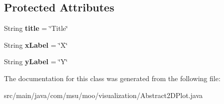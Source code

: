 \subsection*{Protected Attributes}
\begin{DoxyCompactItemize}
\item 
\hypertarget{classcom_1_1msu_1_1moo_1_1visualization_1_1Abstract2DPlot_ac147640f3cb063905aa1e197d3bef23a}{String {\bfseries title} = \char`\"{}Title\char`\"{}}\label{classcom_1_1msu_1_1moo_1_1visualization_1_1Abstract2DPlot_ac147640f3cb063905aa1e197d3bef23a}

\item 
\hypertarget{classcom_1_1msu_1_1moo_1_1visualization_1_1Abstract2DPlot_ac7d30afeecc28908074b9acb0dee7fba}{String {\bfseries x\-Label} = \char`\"{}X\char`\"{}}\label{classcom_1_1msu_1_1moo_1_1visualization_1_1Abstract2DPlot_ac7d30afeecc28908074b9acb0dee7fba}

\item 
\hypertarget{classcom_1_1msu_1_1moo_1_1visualization_1_1Abstract2DPlot_a7c1266b57c84433f3a56a1b29c7956b9}{String {\bfseries y\-Label} = \char`\"{}Y\char`\"{}}\label{classcom_1_1msu_1_1moo_1_1visualization_1_1Abstract2DPlot_a7c1266b57c84433f3a56a1b29c7956b9}

\end{DoxyCompactItemize}


The documentation for this class was generated from the following file\-:\begin{DoxyCompactItemize}
\item 
src/main/java/com/msu/moo/visualization/Abstract2\-D\-Plot.\-java\end{DoxyCompactItemize}
